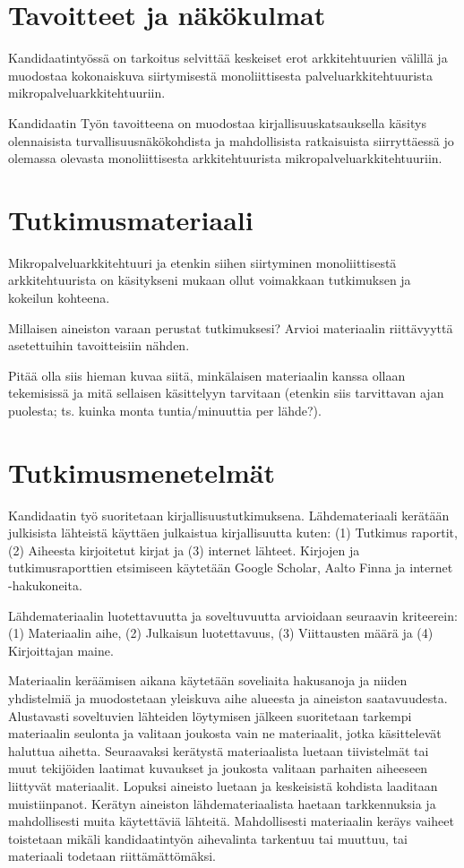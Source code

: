 \documentclass[12pt,a4paper,finnish,oneside]{article}
\begin{document}
\section{Tavoitteet ja näkökulmat}

Kandidaatintyössä on tarkoitus selvittää keskeiset erot arkkitehtuurien välillä ja muodostaa kokonaiskuva 
siirtymisestä monoliittisesta palveluarkkitehtuurista mikropalveluarkkitehtuuriin.

Kandidaatin Työn tavoitteena on muodostaa kirjallisuuskatsauksella käsitys olennaisista turvallisuusnäkökohdista 
ja mahdollisista ratkaisuista siirryttäessä jo olemassa olevasta monoliittisesta arkkitehtuurista mikropalveluarkkitehtuuriin.

\section{Tutkimusmateriaali}

Mikropalveluarkkitehtuuri ja etenkin siihen siirtyminen monoliittisestä arkkitehtuurista on 
käsitykseni mukaan ollut voimakkaan tutkimuksen ja kokeilun kohteena.


Millaisen aineiston varaan perustat tutkimuksesi? Arvioi materiaalin
riittävyyttä asetettuihin tavoitteisiin nähden.

Pitää olla siis hieman kuvaa siitä, minkälaisen materiaalin kanssa
ollaan tekemisissä ja mitä sellaisen käsittelyyn tarvitaan (etenkin
siis tarvittavan ajan puolesta; ts. kuinka monta tuntia/minuuttia per
lähde?).

\section{Tutkimusmenetelmät}


Kandidaatin työ suoritetaan kirjallisuustutkimuksena. Lähdemateriaali kerätään julkisista 
lähteistä käyttäen julkaistua kirjallisuutta kuten: 
(1) Tutkimus raportit, 
(2) Aiheesta kirjoitetut kirjat ja 
(3) internet lähteet.
Kirjojen ja tutkimusraporttien etsimiseen käytetään Google Scholar, Aalto Finna ja internet -hakukoneita.

Lähdemateriaalin luotettavuutta ja soveltuvuutta arvioidaan seuraavin kriteerein: 
(1) Materiaalin aihe, 
(2) Julkaisun luotettavuus, 
(3) Viittausten määrä ja 
(4) Kirjoittajan maine.

Materiaalin keräämisen aikana käytetään soveliaita hakusanoja ja niiden yhdistelmiä ja 
muodostetaan yleiskuva aihe alueesta ja aineiston saatavuudesta.
Alustavasti soveltuvien lähteiden löytymisen jälkeen suoritetaan tarkempi 
materiaalin seulonta ja valitaan joukosta vain ne materiaalit, jotka käsittelevät 
haluttua aihetta.
Seuraavaksi kerätystä materiaalista luetaan tiivistelmät tai muut tekijöiden 
laatimat kuvaukset ja joukosta valitaan parhaiten aiheeseen liittyvät materiaalit.
Lopuksi aineisto luetaan ja keskeisistä kohdista laaditaan muistiinpanot. 
Kerätyn aineiston lähdemateriaalista haetaan tarkkennuksia ja mahdollisesti 
muita käytettäviä lähteitä.
Mahdollisesti materiaalin keräys vaiheet toistetaan mikäli kandidaatintyön 
aihevalinta tarkentuu tai muuttuu, tai materiaali todetaan riittämättömäksi.
\end{document}
